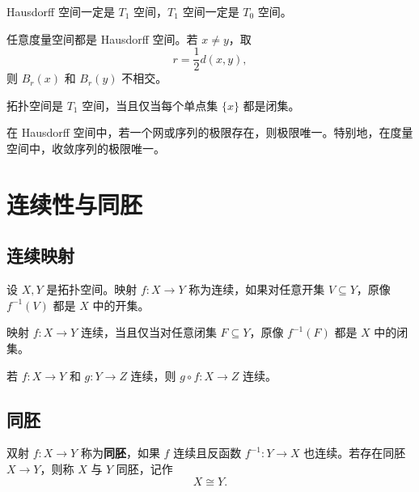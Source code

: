 \begin{proposition}
Hausdorff 空间一定是 $T_1$ 空间，$T_1$ 空间一定是 $T_0$ 空间。
\end{proposition}

\begin{example}
任意度量空间都是 Hausdorff 空间。若 $x\ne y$，取
\[
    r=\frac12 d(x,y),
\]
则 $B_r(x)$ 和 $B_r(y)$ 不相交。
\end{example}

\begin{proposition}
拓扑空间是 $T_1$ 空间，当且仅当每个单点集 $\{x\}$ 都是闭集。
\end{proposition}

\begin{theorem}
在 Hausdorff 空间中，若一个网或序列的极限存在，则极限唯一。特别地，在度量空间中，收敛序列的极限唯一。
\end{theorem}

\section{连续性与同胚}

\subsection{连续映射}

\begin{definition}[连续性]
设 $X,Y$ 是拓扑空间。映射 $f:X\to Y$ 称为连续，如果对任意开集 $V\subseteq Y$，原像 $f^{-1}(V)$ 都是 $X$ 中的开集。
\end{definition}

\begin{proposition}[闭集形式]
映射 $f:X\to Y$ 连续，当且仅当对任意闭集 $F\subseteq Y$，原像 $f^{-1}(F)$ 都是 $X$ 中的闭集。
\end{proposition}

\begin{proposition}[连续映射的复合]
若 $f:X\to Y$ 和 $g:Y\to Z$ 连续，则 $g\circ f:X\to Z$ 连续。
\end{proposition}

\subsection{同胚}

\begin{definition}[同胚]
双射 $f:X\to Y$ 称为\textbf{同胚}，如果 $f$ 连续且反函数 $f^{-1}:Y\to X$ 也连续。若存在同胚 $X\to Y$，则称 $X$ 与 $Y$ 同胚，记作
\[
    X\cong Y.
\]
\end{definition}

